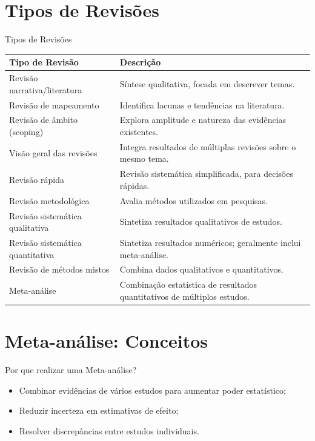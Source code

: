 \documentclass[12pt]{beamer}
\begin{document}
\section{Tipos de Revisões}
\begin{frame}{Tipos de Revisões}
\begin{longtable}{p{6cm} p{7cm}}
\toprule
\textbf{Tipo de Revisão} & \textbf{Descrição} \\
\midrule
Revisão narrativa/literatura & Síntese qualitativa, focada em descrever temas. \\
Revisão de mapeamento & Identifica lacunas e tendências na literatura. \\
Revisão de âmbito (scoping) & Explora amplitude e natureza das evidências existentes. \\
Visão geral das revisões & Integra resultados de múltiplas revisões sobre o mesmo tema. \\
Revisão rápida & Revisão sistemática simplificada, para decisões rápidas. \\
Revisão metodológica & Avalia métodos utilizados em pesquisas. \\
Revisão sistemática qualitativa & Sintetiza resultados qualitativos de estudos. \\
Revisão sistemática quantitativa & Sintetiza resultados numéricos; geralmente inclui meta-análise. \\
Revisão de métodos mistos & Combina dados qualitativos e quantitativos. \\
Meta-análise & Combinação estatística de resultados quantitativos de múltiplos estudos. \\
\bottomrule
\end{longtable}
\end{frame}

\section{Meta-análise: Conceitos}
\begin{frame}{Por que realizar uma Meta-análise?}
\begin{itemize}
    \item Combinar evidências de vários estudos para aumentar poder estatístico;
    \item Reduzir incerteza em estimativas de efeito;
    \item Resolver discrepâncias entre estudos individuais.
\end{itemize}
\end{frame}
\end{document}
